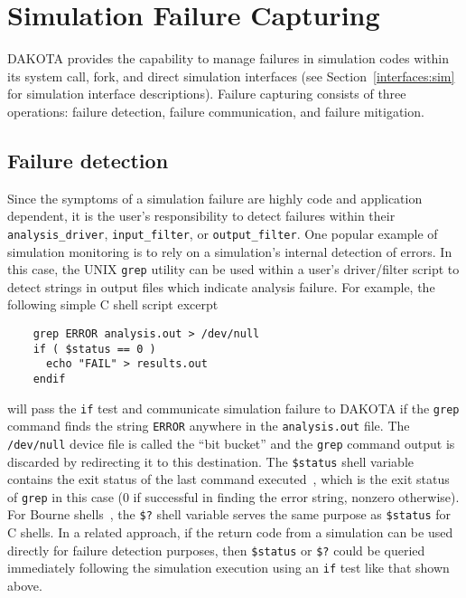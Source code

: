 \chapter{Simulation Failure Capturing}\label{failure}

DAKOTA provides the capability to manage failures in simulation codes
within its system call, fork, and direct simulation interfaces (see
Section~\ref{interfaces:sim} for simulation interface descriptions).
Failure capturing consists of three operations: failure detection,
failure communication, and failure mitigation.

\section{Failure detection}\label{failure:detection}

Since the symptoms of a simulation failure are highly code and
application dependent, it is the user's responsibility to detect
failures within their \texttt{analysis\_driver},
\texttt{input\_filter}, or \texttt{output\_filter}. One popular 
example of simulation monitoring is to rely on a simulation's internal
detection of errors.  In this case, the UNIX \texttt{grep} utility can
be used within a user's driver/filter script to detect strings in
output files which indicate analysis failure. For example, the
following simple C shell script excerpt
\begin{verbatim}
    grep ERROR analysis.out > /dev/null
    if ( $status == 0 )
      echo "FAIL" > results.out
    endif
\end{verbatim}

will pass the \texttt{if} test and communicate simulation failure to
DAKOTA if the \texttt{grep} command finds the string \texttt{ERROR}
anywhere in the \texttt{analysis.out} file. The \texttt{/dev/null}
device file is called the ``bit bucket'' and the \texttt{grep} command
output is discarded by redirecting it to this destination. The
\texttt{\$status} shell variable contains the exit status of the last
command executed~\cite{And86}, which is the exit status of \texttt{grep}
in this case (0 if successful in finding the error string, nonzero
otherwise). For Bourne shells~\cite{Bli96}, the \texttt{\$?} shell
variable serves the same purpose as \texttt{\$status} for C shells. In
a related approach, if the return code from a simulation can be used
directly for failure detection purposes, then \texttt{\$status} or
\texttt{\$?} could be queried immediately following the simulation
execution using an \texttt{if} test like that shown above.

